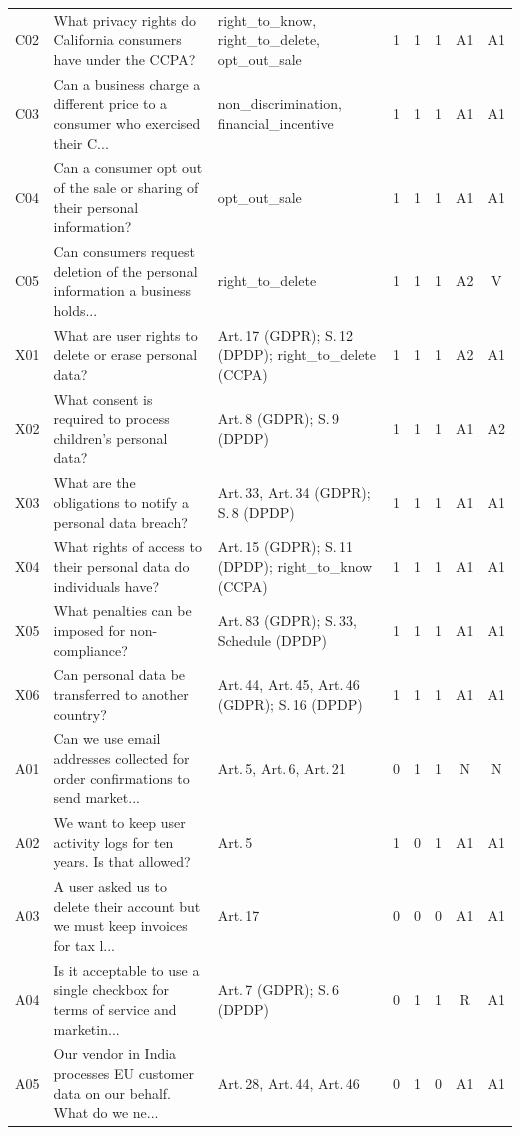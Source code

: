\begin{tabular}{@{}llp{3.1cm}cccc c@{}}
C02 & What privacy rights do California consumers have under the CCPA? & right\_to\_know, right\_to\_delete, opt\_out\_sale & 1 & 1 & 1 & A1 & A1 \\
C03 & Can a business charge a different price to a consumer who exercised their C... & non\_discrimination, financial\_incentive & 1 & 1 & 1 & A1 & A1 \\
C04 & Can a consumer opt out of the sale or sharing of their personal information? & opt\_out\_sale & 1 & 1 & 1 & A1 & A1 \\
C05 & Can consumers request deletion of the personal information a business holds... & right\_to\_delete & 1 & 1 & 1 & A2 & V \\
X01 & What are user rights to delete or erase personal data? & Art.\,17 (GDPR); S.\,12 (DPDP); right\_to\_delete (CCPA) & 1 & 1 & 1 & A2 & A1 \\
X02 & What consent is required to process children's personal data? & Art.\,8 (GDPR); S.\,9 (DPDP) & 1 & 1 & 1 & A1 & A2 \\
X03 & What are the obligations to notify a personal data breach? & Art.\,33, Art.\,34 (GDPR); S.\,8 (DPDP) & 1 & 1 & 1 & A1 & A1 \\
X04 & What rights of access to their personal data do individuals have? & Art.\,15 (GDPR); S.\,11 (DPDP); right\_to\_know (CCPA) & 1 & 1 & 1 & A1 & A1 \\
X05 & What penalties can be imposed for non-compliance? & Art.\,83 (GDPR); S.\,33, Schedule (DPDP) & 1 & 1 & 1 & A1 & A1 \\
X06 & Can personal data be transferred to another country? & Art.\,44, Art.\,45, Art.\,46 (GDPR); S.\,16 (DPDP) & 1 & 1 & 1 & A1 & A1 \\
A01 & Can we use email addresses collected for order confirmations to send market... & Art.\,5, Art.\,6, Art.\,21 & 0 & 1 & 1 & N & N \\
A02 & We want to keep user activity logs for ten years. Is that allowed? & Art.\,5 & 1 & 0 & 1 & A1 & A1 \\
A03 & A user asked us to delete their account but we must keep invoices for tax l... & Art.\,17 & 0 & 0 & 0 & A1 & A1 \\
A04 & Is it acceptable to use a single checkbox for terms of service and marketin... & Art.\,7 (GDPR); S.\,6 (DPDP) & 0 & 1 & 1 & R & A1 \\
A05 & Our vendor in India processes EU customer data on our behalf. What do we ne... & Art.\,28, Art.\,44, Art.\,46 & 0 & 1 & 0 & A1 & A1 \\

\end{tabular}
